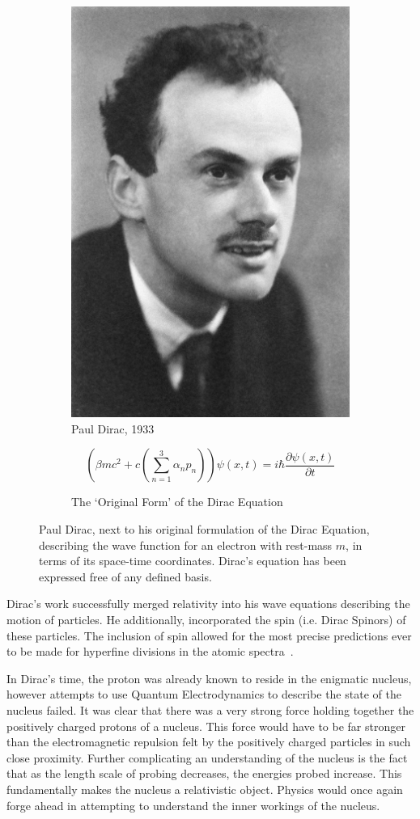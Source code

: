 \begin{figure}[ht]
	\centering
	\begin{subfigure}{.4\textwidth}
		\centering
		\includegraphics[width=0.4\linewidth]{./figures/pauldirac.jpg}
		\caption{Paul Dirac, 1933  \cite{NobelFoundation1933}}
		\label{fig:pauldirac}
	\end{subfigure}%
	\begin{subfigure}{0.6\textwidth}
		\centering
		\begin{equation}
			\left(\beta mc^2 + c\left(\sum_{n \mathop =1}^{3}\alpha_n p_n\right)\right) \psi (x,t) = i \hbar \frac{\partial\psi(x,t) }{\partial t}
		\end{equation}
		\caption{The `Original Form' of the Dirac Equation}
		\label{eq:diracquation}
	\end{subfigure}
	\caption{ 
		Paul Dirac, next to his original formulation of the Dirac Equation,
		describing the wave function for an electron with rest-mass $m$, in terms of
		its space-time coordinates. Dirac's equation has been expressed free of any
    defined basis.
	}
	\label{fig:thomsonrays}
\end{figure}

Dirac's work successfully merged relativity into his wave equations describing
the motion of particles. He additionally, incorporated the spin (i.e. Dirac
Spinors) of these particles. The inclusion of spin allowed for the most precise
predictions ever to be made for hyperfine divisions in the atomic
spectra~\cite{Dirac}.

In Dirac's time, the proton was already known to reside in the enigmatic
nucleus, however attempts to use Quantum Electrodynamics to describe the state
of the nucleus failed. It was clear that there was a very strong force holding
together the positively charged protons of a nucleus. This force would have to
be far stronger than the electromagnetic repulsion felt by the positively
charged particles in such close proximity. Further complicating an understanding
of the nucleus is the fact that as the length scale of probing decreases, the
energies probed increase. This fundamentally makes the nucleus a relativistic
object. Physics would once again forge ahead in attempting to understand the
inner workings of the nucleus.

